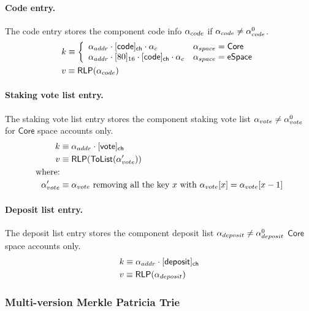 \paragraph{Code entry.} The code entry stores the component code info $\mathbf{\alpha}_{code}$ if $\mathbf{\alpha}_{code}\neq  \mathbf{\alpha}^0_{code}$. 
\begin{align}
	&k\equiv \left\{\begin{array}{ll}
		\alpha_{addr} \cdot [{\sf code}]_{\sf ch}\cdot \alpha_c& \mathbf{\alpha}_{space}=\mathsf{Core} \\
		\alpha_{addr}\cdot [80]_{16}\cdot [{\sf code}]_{\sf ch}\cdot \alpha_c & \mathbf{\alpha}_{space}=\mathsf{eSpace}
	\end{array}\right.\\
	&v\equiv \mathsf{RLP}(\mathbf{\alpha}_{code})
\end{align}

\paragraph{Staking vote list entry.} The staking vote list entry stores the component staking vote list $\mathbf{\alpha}_{vote}\neq  \mathbf{\alpha}^0_{vote}$ for $\mathsf{Core}$ space accounts only.
\begin{align}
	k&\equiv \alpha_{addr}\cdot [{\sf vote}]_{\sf ch}  \\
	v&\equiv \mathsf{RLP}(\mathsf{ToList}(\mathbf{\alpha}'_{vote}))\\
	\mbox{where:}&\notag\\ 
	\mathbf{\alpha}'_{vote} &\equiv \mbox{$\mathbf{\alpha}_{vote}$ removing all the key $x$ with $\mathbf{\alpha}_{vote}[x]=\mathbf{\alpha}_{vote}[x-1]$}
\end{align}

\paragraph{Deposit list entry.} The deposit list entry stores the component deposit list $\mathbf{\alpha}_{deposit}\neq  \mathbf{\alpha}^0_{deposit}$ $\mathsf{Core}$ space accounts only.
\begin{align}
	&k\equiv \alpha_{addr}\cdot [{\sf deposit}]_{\sf ch}  \\
	&v\equiv \mathsf{RLP}(\mathbf{\alpha}_{deposit})
\end{align}

\subsubsection{Multi-version Merkle Patricia Trie}

